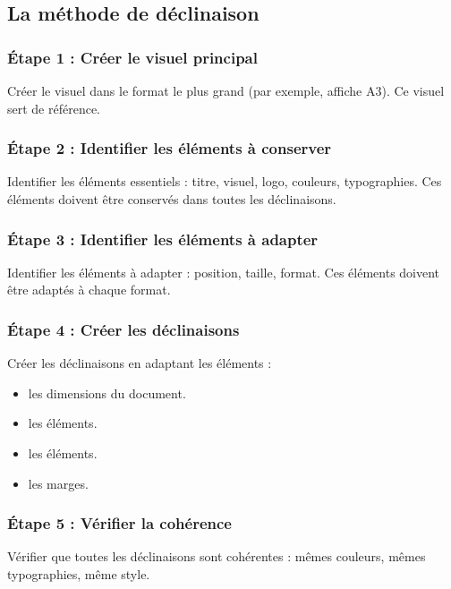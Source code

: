\subsection{La méthode de déclinaison}

\subsubsection{Étape 1 : Créer le visuel principal}

Créer le visuel dans le format le plus grand (par exemple, affiche A3). Ce visuel sert de référence.

\subsubsection{Étape 2 : Identifier les éléments à conserver}

Identifier les éléments essentiels : titre, visuel, logo, couleurs, typographies. Ces éléments doivent être conservés dans toutes les déclinaisons.

\subsubsection{Étape 3 : Identifier les éléments à adapter}

Identifier les éléments à adapter : position, taille, format. Ces éléments doivent être adaptés à chaque format.

\subsubsection{Étape 4 : Créer les déclinaisons}

Créer les déclinaisons en adaptant les éléments :

\begin{itemize}
    \item {} les dimensions du document.
    \item {} les éléments.
    \item {} les éléments.
    \item {} les marges.
\end{itemize}

\subsubsection{Étape 5 : Vérifier la cohérence}

Vérifier que toutes les déclinaisons sont cohérentes : mêmes couleurs, mêmes typographies, même style.

